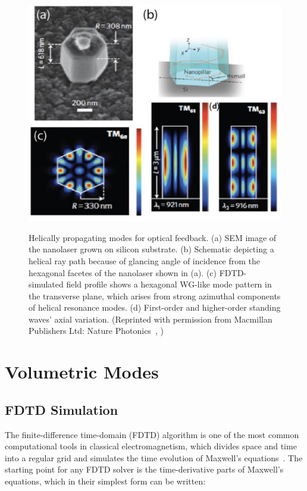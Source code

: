 \begin{figure}
  \caption[Hexlically propagating modes for optical feedback.]{Helically propagating modes for optical feedback. (a) SEM image of the nanolaser grown on silicon substrate. (b) Schematic depicting a helical ray path because of glancing angle of incidence from the hexagonal facetes of the nanolaser shown in (a). (c) FDTD-simulated field profile shows a hexagonal WG-like mode pattern in the transverse plane, which arises from strong azimuthal components of helical resonance modes. (d) First-order and higher-order standing waves' axial variation. (Reprinted with permission from Macmillan Publishers Ltd: Nature Photonics~\cite{Chen:2011cg}, )}
  \centering
  \includegraphics[width=\textwidth]{pictures/LM/HelicalMode}
  \label{HelicalMode}
\end{figure}

\section{Volumetric Modes} \label{VM} 
\subsection{FDTD Simulation}

The finite-difference time-domain (FDTD) algorithm is one of the most common
computational tools in classical electromagnetism, which divides space and time
into a regular grid and simulates the time evolution of Maxwell's
equations~\cite{sullivan2013electromagnetic,taflove2005computational}. The
starting point for any FDTD solver is the time-derivative parts of Maxwell's
equations, which in their simplest form can be written:

